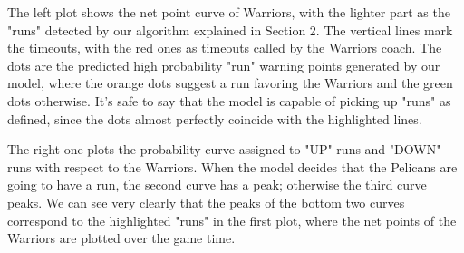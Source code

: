 \documentclass{article}
\begin{document}
The left plot shows the net point curve of Warriors, with the lighter part as the "runs" detected by our algorithm explained in Section 2. The vertical lines mark the timeouts, with the red ones as timeouts called by the Warriors coach. The dots are the predicted high probability "run" warning points generated by our model, where the orange dots suggest a run favoring the Warriors and the green dots otherwise. It's safe to say that the model is capable of picking up "runs" as defined, since the dots almost perfectly coincide with the highlighted lines. \newline

The right one plots the probability curve assigned to "UP" runs and "DOWN" runs with respect to the Warriors. When the model decides that the Pelicans are going to have a run, the second curve has a peak; otherwise the third curve peaks. We can see very clearly that the peaks of the bottom two curves correspond to the highlighted "runs" in the first plot, where the net points of the Warriors are plotted over the game time.\newline
\end{document}
